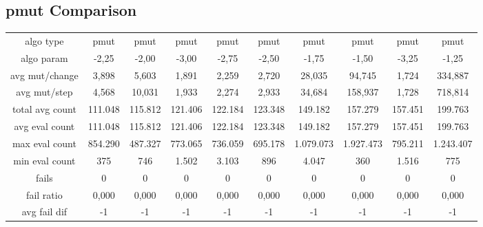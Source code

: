 \subsection{pmut Comparison}

\begin{tabular}[h]{cccccccccc}
algo type&             pmut&      pmut&      pmut&      pmut&      pmut&      pmut&      pmut&      pmut&      pmut\\
algo param&           -2,25&     -2,00&     -3,00&     -2,75&     -2,50&     -1,75&     -1,50&     -3,25&     -1,25\\
avg mut/change&       3,898&     5,603&     1,891&     2,259&     2,720&    28,035&    94,745&     1,724&   334,887\\
avg mut/step&         4,568&    10,031&     1,933&     2,274&     2,933&    34,684&   158,937&     1,728&   718,814\\
\hline
total avg count&    111.048&   115.812&   121.406&   122.184&   123.348&   149.182&   157.279&   157.451&   199.763\\
avg eval count&     111.048&   115.812&   121.406&   122.184&   123.348&   149.182&   157.279&   157.451&   199.763\\
max eval count&     854.290&   487.327&   773.065&   736.059&   695.178& 1.079.073& 1.927.473&   795.211& 1.243.407\\
min eval count&         375&       746&     1.502&     3.103&       896&     4.047&       360&     1.516&       775\\
\hline
fails&                    0&         0&         0&         0&         0&         0&         0&         0&         0\\
fail ratio&           0,000&     0,000&     0,000&     0,000&     0,000&     0,000&     0,000&     0,000&     0,000\\
avg fail dif&            -1&        -1&        -1&        -1&        -1&        -1&        -1&        -1&        -1\\
\end{tabular}


